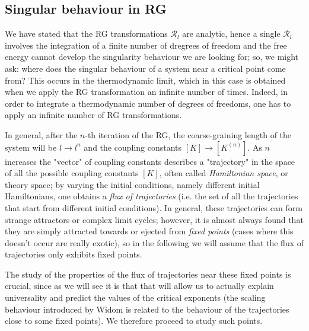 \documentclass[../main/main.tex]{subfiles}
\begin{document}
\subsection{Singular behaviour in RG}

We have stated that the RG transformations \( \mathcal{R}_l \) are analytic, hence a single \( \mathcal{R}_l \) involves the integration of a finite number of dregrees of freedom and the free energy cannot develop the singularity behaviour we are looking for; so, we might ask: where does the singular behaviour of a system near a critical point come from? This occurs in the thermodynamic limit, which in this case is obtained when we apply the RG transformation an infinite number of times. Indeed, in order to integrate a thermodynamic number of degrees of freedoms, one has to apply an infinite number of RG transformations.

In general, after the \( n \)-th iteration of the RG, the coarse-graining length of the system will be \( l \rightarrow l^n \) and the coupling constants \( [K] \rightarrow [K^{(n)}] \).
As \( n \) increases the "vector" of coupling constants describes a "trajectory" in the space of all the possible coupling constants \( [K] \), often called \emph{Hamiltonian space}, or theory space;
by varying the initial conditions, namely different initial Hamiltonians, one obtains a
\emph{flux of trajectories} (i.e. the set of all the trajectories that start from different initial conditions).
In general, these trajectories can form strange attractors or complex limit cycles; however, it is almost always found that they are simply attracted towards or ejected from \emph{fixed points} (cases where this doesn't occur are really exotic), so in the following we will assume that the flux of trajectories only exhibits fixed points.

The study of the properties of the flux of trajectories near these fixed points is crucial, since as we will see it is that that will allow us to actually explain universality and predict the values of the critical exponents (the scaling behaviour introduced by Widom is related to the behaviour of the trajectories close to some fixed points). We therefore proceed to study such points.
\end{document}
